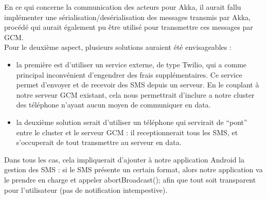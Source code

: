 \documentclass[a4paper,12pt]{article}
\begin{document}
En ce qui concerne la communication des acteurs pour Akka, il aurait fallu
implémenter une sérialisation/desérialisation des messages transmis par Akka,
procédé qui aurait également pu être utilisé pour transmettre ces messages par
GCM.\\
Pour le deuxième aspect, plusieurs solutions auraient été envisageables :\\
\begin{itemize}
\item la première est d’utiliser un service externe, de type Twilio, qui a
  comme principal inconvénient d’engendrer des frais supplémentaires. Ce
  service permet d’envoyer et de recevoir des SMS depuis un serveur. En le
  couplant à notre serveur GCM existant, cela nous permettrait d’inclure a
  notre cluster des téléphone n’ayant aucun moyen de communiquer en data.\\
\item la deuxième solution serait d’utiliser un téléphone qui servirait de
  “pont” entre le cluster et le serveur GCM : il receptionnerait tous les SMS,
  et s’occuperait de tout transmettre au serveur en data.
\end{itemize}
Dans tous les cas, cela impliquerait d’ajouter à notre application Android la
gestion des SMS : si le SMS présente un certain format, alors notre application
va le prendre en charge et appeler abortBroadcast(); afin que tout soit
transparent pour l’utilisateur (pas de notification intempestive).
\end{document}
